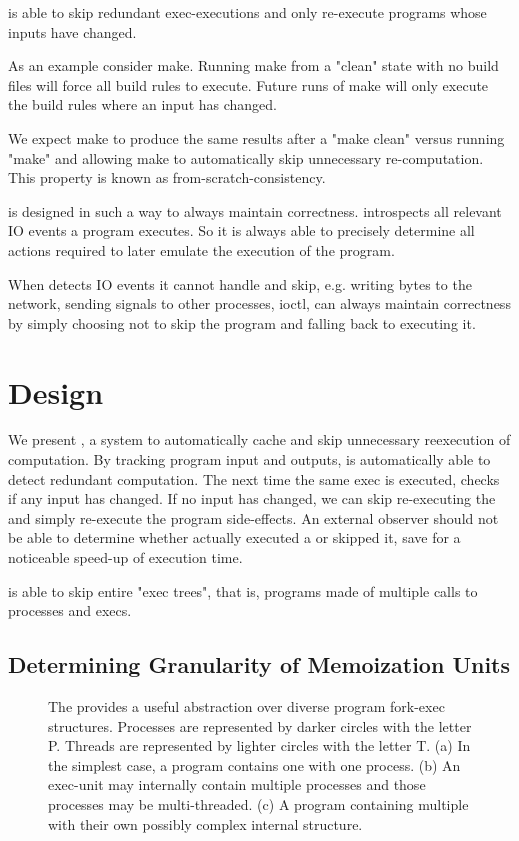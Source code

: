 \pc is able to skip redundant exec-executions and only re-execute programs whose inputs have changed.

As an example consider make. Running make from a "clean" state with no build files will force all build
rules to execute. Future runs of make will only execute the build rules where an input has changed.

We expect make to produce the same results after a "make clean" versus running "make" and allowing make
to automatically skip unnecessary re-computation. This property is known as from-scratch-consistency.

\pc is designed in such a way to always maintain correctness. \pc introspects all relevant IO
events a program executes. So it is always able to precisely determine all actions required to later
emulate the execution of the program.

When \pc detects IO events it cannot handle and skip, e.g. writing bytes to the network, sending signals
to other processes, ioctl, \pc can always maintain correctness by simply choosing not to skip the
program and falling back to executing it.

\section{\pc Design}
We present \pc, a system to automatically cache and skip unnecessary reexecution of computation. By tracking program input and outputs, \pc is automatically able to detect redundant computation. The next time the same exec is executed, \pc checks if any input has changed. If no input has changed, we can skip re-executing the \cacheunit and simply re-execute the program side-effects. An external observer should not be able to determine whether \pc actually executed a \cacheunit or skipped it, save for a noticeable speed-up of execution time.

\pc is able to skip entire "exec trees", that is, programs made of multiple calls to processes and execs.
\subsection{Determining Granularity of Memoization Units}

\begin{figure*}
\centering
{}
\caption{The \cacheunit provides a useful abstraction over diverse program fork-exec structures. Processes are represented by darker circles with the letter P. Threads are represented by lighter
circles with the letter T. (a) In the simplest case, a program contains one \cacheunit with one process. (b) An exec-unit may internally contain multiple processes and those processes may be multi-threaded. (c) A program containing multiple \cacheunit with their own possibly complex internal
structure.}
\label{fig:exec-units}
\end{figure*}

